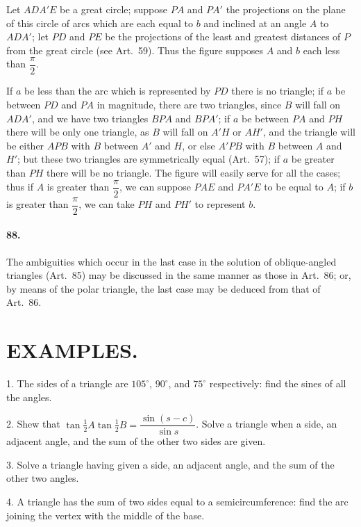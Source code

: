 \documentclass{book}[2004/02/16]
\begin{document}
\begin{mainmatter}
\begin{spacing}{1.3}
Let $ADA'E$ be a great circle; suppose $PA$ and $PA'$ the
projections on the plane of this circle of arcs which are each
equal to $b$ and inclined at an angle $A$ to $ADA'$; let $PD$ and
$PE$ be the projections of the least and greatest distances of $P$
from the great circle (see Art.\ 59). Thus the figure supposes
$A$ and $b$ each less than $\dfrac{\pi}{2}$.

If $a$ be less than the arc which is represented by $PD$ there is
no triangle; if $a$ be between $PD$ and $PA$ in magnitude, there are
two triangles, since $B$ will fall on $ADA'$, and we have two triangles
$BPA$ and $BPA'$; if $a$ be between $PA$ and $PH$ there will be only
one triangle, as $B$ will fall on $A'H$ or $AH'$, and the triangle will be
either $APB$ with $B$ between $A'$ and $H$, or else $A'PB$ with $B$ between
$A$ and $H'$; but these two triangles are symmetrically equal
(Art.\ 57); if $a$ be greater than $PH$ there will be no triangle.
The figure will easily serve for all the cases; thus if $A$ is greater
than $\dfrac{\pi}{2}$, we can suppose $PAE$ and $PA'E$ to be equal to $A$; if
$b$ is greater than $\dfrac{\pi}{2}$, we can take $PH$ and $PH'$ to represent $b$.

\paragraph{88.} The ambiguities which occur in the last case in the solution
of oblique-angled triangles (Art.\ 85) may be discussed in the
same manner as those in Art.\ 86; or, by means of the polar
triangle, the last case may be deduced from that of Art.~86.

\section*{\centering\normalsize EXAMPLES.}

1. The sides of a triangle are $105^\circ$, $90^\circ$, and $75^\circ$ respectively:
find the sines of all the angles.
\medskip

2. Shew that $\tan \tfrac{1}{2} A \tan \tfrac{1}{2} B= \dfrac{\sin(s-c)}{\sin s}$. Solve a triangle
when a side, an adjacent angle, and the sum of the other two
sides are given.
\medskip

3. Solve a triangle having given a side, an adjacent angle,
and the sum of the other two angles.
\medskip

4. A triangle has the sum of two sides equal to a semicircumference:
find the arc joining the vertex with the middle of
the base.
\medskip


\end{spacing}
\end{mainmatter}
\end{document}
